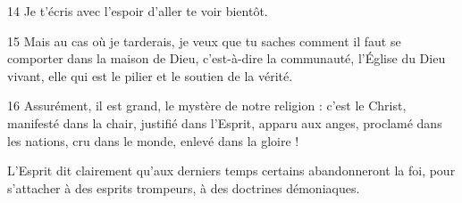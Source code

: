 
14 Je t’écris avec l’espoir d’aller te voir bientôt.

15 Mais au cas où je tarderais, je veux que tu saches comment il faut se comporter dans la maison de Dieu, c’est-à-dire la communauté, l’Église du Dieu vivant, elle qui est le pilier et le soutien de la vérité.

16 Assurément, il est grand, le mystère de notre religion : c’est le Christ, manifesté dans la chair, justifié dans l’Esprit, apparu aux anges, proclamé dans les nations, cru dans le monde, enlevé dans la gloire !

L’Esprit dit clairement qu’aux derniers temps certains abandonneront la foi, pour s’attacher à des esprits trompeurs, à des doctrines démoniaques.